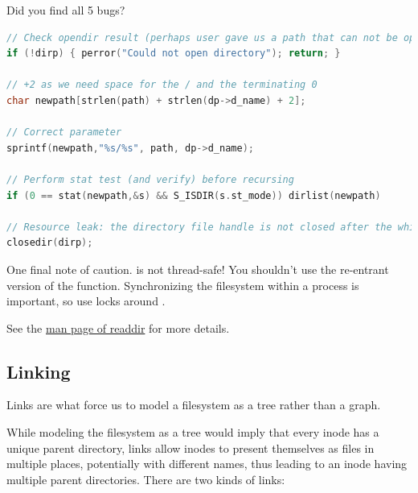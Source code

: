 Did you find all 5 bugs?

\begin{lstlisting}[language=C]
// Check opendir result (perhaps user gave us a path that can not be opened as a directory
if (!dirp) { perror("Could not open directory"); return; }

// +2 as we need space for the / and the terminating 0
char newpath[strlen(path) + strlen(dp->d_name) + 2];

// Correct parameter
sprintf(newpath,"%s/%s", path, dp->d_name);

// Perform stat test (and verify) before recursing
if (0 == stat(newpath,&s) && S_ISDIR(s.st_mode)) dirlist(newpath)

// Resource leak: the directory file handle is not closed after the while loop
closedir(dirp);
\end{lstlisting}

One final note of caution.
 is not thread-safe!
You shouldn't use the re-entrant version of the function.
Synchronizing the filesystem within a process is important, so use locks around .

See the \href{https://linux.die.net/man/3/readdir}{man page of readdir} for more details.

\subsection{Linking}

Links are what force us to model a filesystem as a tree rather than a graph.

While modeling the filesystem as a tree would imply that every inode has a unique parent directory, links allow inodes to present themselves as files in multiple places, potentially with different names, thus leading to an inode having multiple parent directories.
There are two kinds of links:

